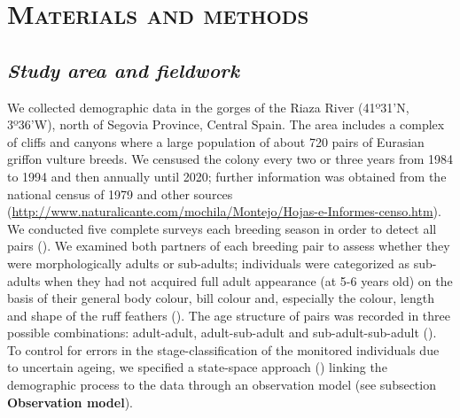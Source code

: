 \documentclass[12pt]{article}
\begin{document}
\section*{\textsc{Materials and methods}}

\subsection*{\textit{Study area and fieldwork}}
We collected demographic data in the gorges of the Riaza River (41º31'N, 3º36'W), north of Segovia Province, Central Spain. The area includes a complex of cliffs and canyons where a large population of about 720 pairs of Eurasian griffon vulture breeds. We censused the colony every two or three years from 1984 to 1994 and then annually until 2020; further information was obtained from the national census of 1979 and other sources (\url{http://www.naturalicante.com/mochila/Montejo/Hojas-e-Informes-censo.htm}). We conducted five complete surveys each breeding season in order to detect all pairs (\cite{Martinez1997}). We examined both partners of each breeding pair to assess whether they were morphologically adults or sub-adults; individuals were categorized as sub-adults when they had not acquired full adult appearance (at 5-6 years old) on the basis of their general body colour, bill colour and, especially the colour, length and shape of the ruff feathers (\cite{Elosegui1989,Blanco1996,Duriez2011}). The age structure of pairs was recorded in three possible combinations: adult-adult, adult-sub-adult and sub-adult-sub-adult (\cite{Blanco1996,Blanco1997}). To control for errors in the stage-classification of the monitored individuals due to uncertain ageing, we specified a state-space approach (\cite{King2010}) linking the demographic process to the data through an observation model (see subsection \textbf{Observation model}).\\
\end{document}
